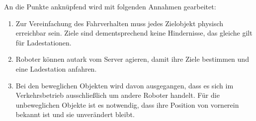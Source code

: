 An die Punkte anknüpfend wird mit folgenden Annahmen gearbeitet:\\
\begin{enumerate}
	\item Zur Vereinfachung des Fahrverhalten muss jedes Zielobjekt physisch erreichbar sein. Ziele sind dementsprechend keine Hindernisse, das gleiche gilt für Ladestationen.
	\item Roboter können autark vom Server agieren, damit ihre Ziele bestimmen und eine Ladestation anfahren.
	\item Bei den beweglichen Objekten wird davon ausgegangen, dass es sich im Verkehrsbetrieb ausschließlich um andere Roboter handelt. Für die unbeweglichen Objekte ist es notwendig, dass ihre Position von vornerein bekannt ist und sie unverändert bleibt.
\end{enumerate}
